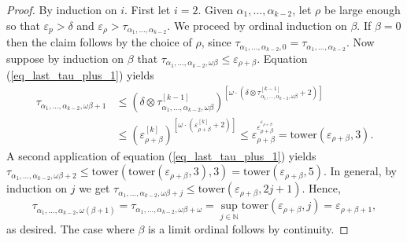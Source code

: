 \documentclass{article}
\theoremstyle{definition}
\newcommand{\N}{\mathbb N}
\begin{document}
\begin{proof}
    By induction on $i$. First let $i=2$. Given $\alpha_1,\ldots,\alpha_{k-2}$, let $\rho$ be large enough so that $\varepsilon_p>\delta$ and $\varepsilon_\rho>\tau_{\alpha_1,\ldots,\alpha_{k-2}}$. We proceed by ordinal induction on $\beta$. If $\beta=0$ then the claim follows by the choice of $\rho$, since $\tau_{\alpha_1,\ldots,\alpha_{k-2},0}=\tau_{\alpha_1,\ldots,\alpha_{k-2}}$. Now suppose by induction on $\beta$ that $\tau_{\alpha_1,\ldots,\alpha_{k-2},\omega\beta}\le\varepsilon_{\rho+\beta}$. Equation (\ref{eq_last_tau_plus_1}) yields
    \begin{align*}
        \tau_{\alpha_1,\ldots,\alpha_{k-2},\omega\beta+1}&\le(\delta\otimes\tau_{\alpha_1,\ldots,\alpha_{k-2},\omega\beta}^{[k-1]})^{[\omega\cdot(\delta\otimes\tau_{\alpha_1,\ldots,\alpha_{k-2},\omega\beta}^{[k-1]}+2)]}\\&\le(\varepsilon_{\rho+\beta}^{[k]})^{[\omega\cdot(\varepsilon_{\rho+\beta}^{[k]}+2)]}\le\varepsilon_{\rho+\beta}^{\varepsilon_{\rho+\beta}^{\varepsilon_{\rho+\beta}}}=\mathrm{tower}(\varepsilon_{\rho+\beta},3).
    \end{align*}
    A second application of equation (\ref{eq_last_tau_plus_1}) yields $\tau_{\alpha_1,\ldots,\alpha_{k-2},\omega\beta+2}\le\mathrm{tower}(\mathrm{tower}(\varepsilon_{\rho+\beta},3),3)=\mathrm{tower}(\varepsilon_{\rho+\beta},5)$. In general, by induction on $j$ we get $\tau_{\alpha_1,\ldots,\alpha_{k-2},\omega\beta+j}\le\mathrm{tower}(\varepsilon_{\rho+\beta},2j+1)$. Hence,
    \begin{equation*}
        \tau_{\alpha_1,\ldots,\alpha_{k-2},\omega(\beta+1)}=\tau_{\alpha_1,\ldots,\alpha_{k-2},\omega\beta+\omega}=\sup_{j\in\N}\mathrm{tower}(\varepsilon_{\rho+\beta},j)=\varepsilon_{\rho+\beta+1},
    \end{equation*}
    as desired. The case where $\beta$ is a limit ordinal follows by continuity.    
    

\end{proof}
\end{document}
